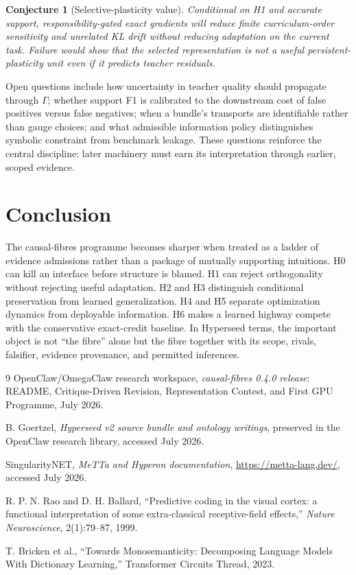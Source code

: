 \documentclass[11pt]{article}
\newtheorem{conjecture}[definition]{Conjecture}
\begin{document}
\begin{conjecture}[Selective-plasticity value]
Conditional on H1 and accurate support, responsibility-gated exact gradients
will reduce finite curriculum-order sensitivity and unrelated KL drift without
reducing adaptation on the current task.  Failure would show that the selected
representation is not a useful persistent-plasticity unit even if it predicts
teacher residuals.
\end{conjecture}

Open questions include how uncertainty in teacher quality should propagate
through $\Gamma$; whether support F1 is calibrated to the downstream cost of
false positives versus false negatives; when a bundle's transports are
identifiable rather than gauge choices; and what admissible information policy
distinguishes symbolic constraint from benchmark leakage.  These questions
reinforce the central discipline: later machinery must earn its interpretation
through earlier, scoped evidence.

\section{Conclusion}

The causal-fibres programme becomes sharper when treated as a ladder of
evidence admissions rather than a package of mutually supporting intuitions.
H0 can kill an interface before structure is blamed.  H1 can reject
orthogonality without rejecting useful adaptation.  H2 and H3 distinguish
conditional preservation from learned generalization.  H4 and H5 separate
optimization dynamics from deployable information.  H6 makes a learned
highway compete with the conservative exact-credit baseline.  In Hyperseed
terms, the important object is not ``the fibre'' alone but the fibre together
with its scope, rivals, falsifier, evidence provenance, and permitted
inferences.

\begin{thebibliography}{9}
OpenClaw/OmegaClaw research workspace,
\emph{causal-fibres 0.4.0 release}: README, Critique-Driven Revision,
Representation Contest, and First GPU Programme, July 2026.

B. Goertzel,
\emph{Hyperseed v2 source bundle and ontology writings},
preserved in the OpenClaw research library, accessed July 2026.

SingularityNET,
\emph{MeTTa and Hyperon documentation},
\url{https://metta-lang.dev/}, accessed July 2026.

R. P. N. Rao and D. H. Ballard,
``Predictive coding in the visual cortex: a functional interpretation of some
extra-classical receptive-field effects,''
\emph{Nature Neuroscience}, 2(1):79--87, 1999.

T. Bricken et al.,
``Towards Monosemanticity: Decomposing Language Models With Dictionary
Learning,'' Transformer Circuits Thread, 2023.
\end{thebibliography}
\end{document}
